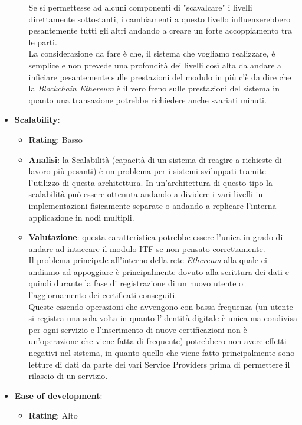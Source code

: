 \begin{itemize}
\begin{itemize}
		Se si permettesse ad alcuni componenti di "scavalcare" i livelli direttamente sottostanti, i cambiamenti a questo livello influenzerebbero pesantemente tutti gli altri andando a creare un forte accoppiamento tra le parti.\\
		La considerazione da fare è che, il sistema che vogliamo realizzare, è semplice e non prevede una profondità dei livelli così alta da andare a inficiare pesantemente sulle prestazioni del modulo in più c'è da dire che la \textit{Blockchain Ethereum} è il vero freno sulle prestazioni del sistema in quanto una transazione potrebbe richiedere anche svariati minuti.
	\end{itemize}
	\item \textbf{Scalability}:
	\begin{itemize}
		\item \textbf{Rating}: Basso
		\item \textbf{Analisi}: la Scalabilità (capacità di un sistema di reagire a richieste di lavoro più pesanti) è un problema per i sistemi sviluppati tramite l'utilizzo di questa architettura. In un'architettura di questo tipo la scalabilità può essere ottenuta andando a dividere i vari livelli in implementazioni fisicamente separate o andando a replicare l'interna applicazione in nodi multipli\cite{3tierArch, 3tierArch2}.
		\item \textbf{Valutazione}: questa caratteristica potrebbe essere l'unica in grado di andare ad intaccare il modulo \gls{ITF} se non pensato correttamente.\\
		Il problema principale all'interno della rete \textit{Ethereum} alla quale ci andiamo ad appoggiare è principalmente dovuto alla scrittura dei dati e quindi durante la fase di registrazione di un nuovo utente o l'aggiornamento dei certificati conseguiti.\\
		Queste essendo operazioni che avvengono con bassa frequenza (un utente si registra una sola volta in quanto l'identità digitale è unica ma condivisa per ogni servizio e l'inserimento di nuove certificazioni non è un'operazione che viene fatta di frequente) potrebbero non avere effetti negativi nel sistema, in quanto quello che viene fatto principalmente sono letture di dati da parte dei vari Service Providers prima di permettere il rilascio di un servizio.
	\end{itemize}
	\item \textbf{Ease of development}:
	\begin{itemize}
		\item \textbf{Rating}: Alto

\end{itemize}
\end{itemize}
